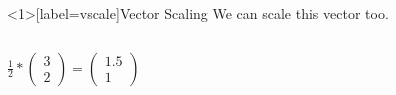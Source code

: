 \documentclass{beamer}
\begin{document}
\begin{frame}<1>[label=vscale]{Vector Scaling}
    We can scale this vector too.
    \begin{columns}
    \centering
    \begin{math}
        \frac{1}{2} * \begin{pmatrix}
            3 \\ 2
        \end{pmatrix}
        = \begin{pmatrix}
            1.5 \\ 1
        \end{pmatrix}
    \end{math}
    \end{columns}
\end{frame}
\end{document}
